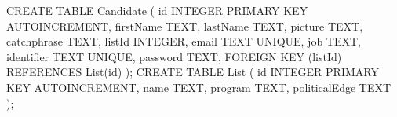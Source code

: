 \noindent
CREATE TABLE Candidate
    \newline\indent\indent
    (
        \newline\indent\indent\indent
        id INTEGER PRIMARY KEY AUTOINCREMENT,
        \newline\indent\indent\indent
        firstName TEXT,
        \newline\indent\indent\indent
        lastName TEXT,
        \newline\indent\indent\indent
        picture TEXT,
        \newline\indent\indent\indent
        catchphrase TEXT,
        \newline\indent\indent\indent
        listId INTEGER,
        \newline\indent\indent\indent
        email TEXT UNIQUE,
        \newline\indent\indent\indent
        job TEXT,
        \newline\indent\indent\indent
        identifier TEXT UNIQUE,
        \newline\indent\indent\indent
        password TEXT,
        \newline\indent\indent\indent
        FOREIGN KEY (listId) REFERENCES List(id)
    \newline\indent\indent
    );
\newline\newline
CREATE TABLE List
    \newline\indent\indent
    (
        \newline\indent\indent\indent
        id INTEGER PRIMARY KEY AUTOINCREMENT,
        \newline\indent\indent\indent
        name TEXT,
        \newline\indent\indent\indent
        program TEXT,
        \newline\indent\indent\indent
        politicalEdge TEXT
    \newline\indent\indent
    );
\newline\newline
\newpage

